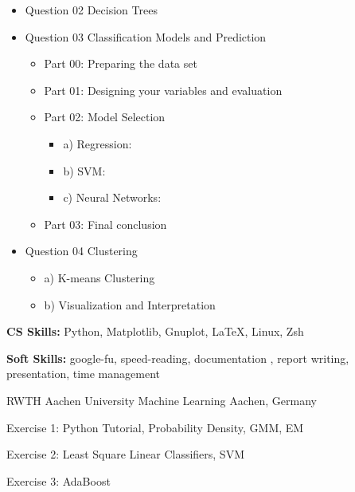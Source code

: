 \begin{cventries}
{\begin{cvitems}
{\begin{itemize}
\begin{itemize}
            \item Part 01: Basic data analysis
            \item Part 02: Basic visualization
        \end{itemize}
        \item Question 02 Decision Trees
        \item Question 03 Classification Models and Prediction
        \begin{itemize}
            \item Part 00: Preparing the data set
            \item Part 01: Designing your variables and evaluation
            \item Part 02: Model Selection
            \begin{itemize}
                \item a) Regression:
                \item b) SVM:
                \item c) Neural Networks:
            \end{itemize}
        \item Part 03: Final conclusion
        \end{itemize}
        \item Question 04 Clustering
        \begin{itemize}
            \item a) K-means Clustering
            \item b) Visualization and Interpretation
        \end{itemize}
        \end{itemize}}
        \item {\textbf{CS Skills:} Python, Matplotlib, Gnuplot, LaTeX, Linux, Zsh}
        \item {\textbf{Soft Skills:} google-fu, speed-reading, documentation , report writing, presentation, time management}
      \end{cvitems}
    }
  \cventry
    {RWTH Aachen University} %
    {Machine Learning} %
    {Aachen, Germany} %
    {} %
    {
      \begin{cvitems} %
      \item Exercise 1: Python Tutorial, Probability Density, GMM, EM
      \item Exercise 2: Least Square Linear Classifiers, SVM
      \item Exercise 3: AdaBoost

\end{cvitems}}
\end{cventries}
